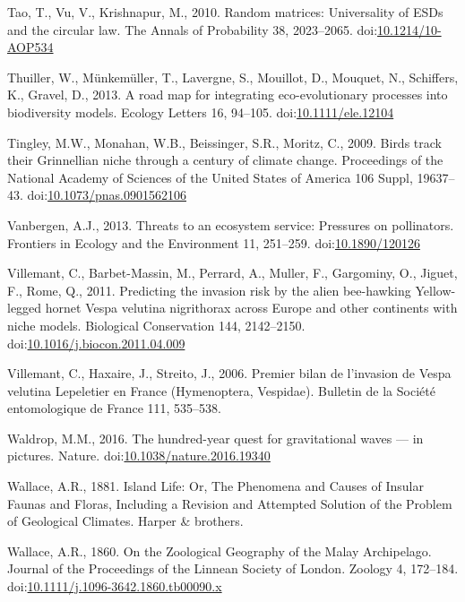 \hypertarget{ref-Tao2010}{}
Tao, T., Vu, V., Krishnapur, M., 2010. Random matrices: Universality of
ESDs and the circular law. The Annals of Probability 38, 2023--2065.
doi:\href{https://doi.org/10.1214/10-AOP534}{10.1214/10-AOP534}

\hypertarget{ref-Thuiller2013}{}
Thuiller, W., Münkemüller, T., Lavergne, S., Mouillot, D., Mouquet, N.,
Schiffers, K., Gravel, D., 2013. A road map for integrating
eco-evolutionary processes into biodiversity models. Ecology Letters 16,
94--105. doi:\href{https://doi.org/10.1111/ele.12104}{10.1111/ele.12104}

\hypertarget{ref-Tingley2009}{}
Tingley, M.W., Monahan, W.B., Beissinger, S.R., Moritz, C., 2009. Birds
track their Grinnellian niche through a century of climate change.
Proceedings of the National Academy of Sciences of the United States of
America 106 Suppl, 19637--43.
doi:\href{https://doi.org/10.1073/pnas.0901562106}{10.1073/pnas.0901562106}

\hypertarget{ref-Vanbergen2013}{}
Vanbergen, A.J., 2013. Threats to an ecosystem service: Pressures on
pollinators. Frontiers in Ecology and the Environment 11, 251--259.
doi:\href{https://doi.org/10.1890/120126}{10.1890/120126}

\hypertarget{ref-Villemant2011}{}
Villemant, C., Barbet-Massin, M., Perrard, A., Muller, F., Gargominy,
O., Jiguet, F., Rome, Q., 2011. Predicting the invasion risk by the
alien bee-hawking Yellow-legged hornet Vespa velutina nigrithorax across
Europe and other continents with niche models. Biological Conservation
144, 2142--2150.
doi:\href{https://doi.org/10.1016/j.biocon.2011.04.009}{10.1016/j.biocon.2011.04.009}

\hypertarget{ref-Villemant2006}{}
Villemant, C., Haxaire, J., Streito, J., 2006. Premier bilan de
l'invasion de Vespa velutina Lepeletier en France (Hymenoptera,
Vespidae). Bulletin de la Société entomologique de France 111, 535--538.

\hypertarget{ref-Waldrop2016}{}
Waldrop, M.M., 2016. The hundred-year quest for gravitational waves ---
in pictures. Nature.
doi:\href{https://doi.org/10.1038/nature.2016.19340}{10.1038/nature.2016.19340}

\hypertarget{ref-wallace1881island}{}
Wallace, A.R., 1881. Island Life: Or, The Phenomena and Causes of
Insular Faunas and Floras, Including a Revision and Attempted Solution
of the Problem of Geological Climates. Harper \& brothers.

\hypertarget{ref-Wallace1860}{}
Wallace, A.R., 1860. On the Zoological Geography of the Malay
Archipelago. Journal of the Proceedings of the Linnean Society of
London. Zoology 4, 172--184.
doi:\href{https://doi.org/10.1111/j.1096-3642.1860.tb00090.x}{10.1111/j.1096-3642.1860.tb00090.x}

